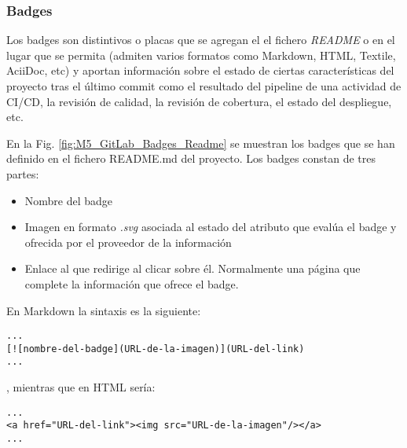 \subsubsection{Badges}

Los badges son distintivos o placas que se agregan el el fichero \textit{README} o en el lugar que se permita (admiten varios formatos como Markdown, HTML, Textile, AciiDoc, etc) y aportan información sobre el estado de ciertas características del proyecto tras el último commit como el resultado del pipeline de una actividad de CI/CD, la revisión de calidad, la revisión de cobertura, el estado del despliegue, etc.

En la Fig. \ref{fig:M5_GitLab_Badges_Readme} se muestran los badges que se han definido en el fichero README.md del proyecto. Los badges constan de tres partes:
\begin{itemize}
	\tightlist
	\item Nombre del badge
	\item Imagen en formato \textit{.svg} asociada al estado del atributo que evalúa el badge y ofrecida por el proveedor de la información
	\item Enlace al que redirige al clicar sobre él. Normalmente una página que complete la información que ofrece el badge.
\end{itemize}
En Markdown la sintaxis es la siguiente:

\begin{minipage}{\linewidth}
{\tiny
\begin{lstlisting}[breaklines]
...
[![nombre-del-badge](URL-de-la-imagen)](URL-del-link)
...		
\end{lstlisting}
}
\end{minipage}
, mientras que en HTML sería:

\begin{minipage}{\linewidth}
{\tiny
\begin{lstlisting}[breaklines]
...
<a href="URL-del-link"><img src="URL-de-la-imagen"/></a>
...		
\end{lstlisting}
}
\end{minipage}


